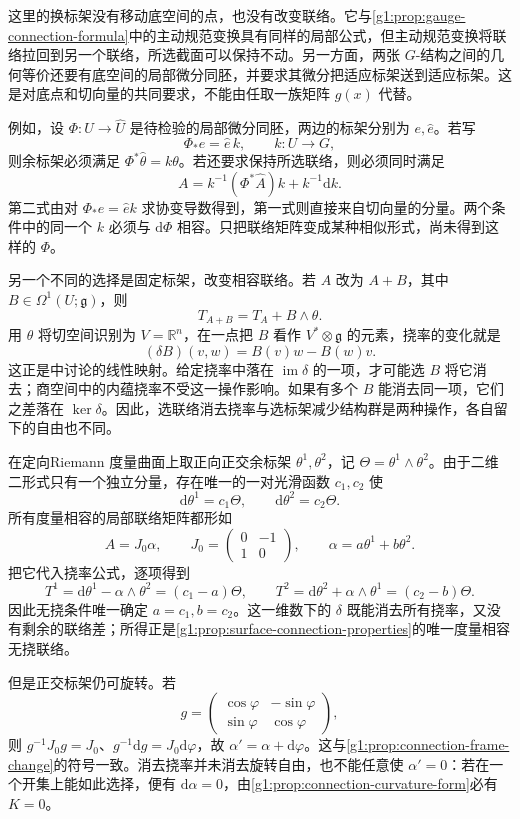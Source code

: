 这里的换标架没有移动底空间的点，也没有改变联络。它与\cref{g1:prop:gauge-connection-formula}中的主动规范变换具有同样的局部公式，但主动规范变换将联络拉回到另一个联络，所选截面可以保持不动。另一方面，两张 \(G\)-结构之间的几何等价还要有底空间的局部微分同胚，并要求其微分把适应标架送到适应标架。这是对底点和切向量的共同要求，不能由任取一族矩阵 \(g(x)\) 代替。

\ProseParagraphBreak

例如，设 \(\Phi:U\to\widehat U\) 是待检验的局部微分同胚，两边的标架分别为 \(e,\widehat e\)。若写
\[
	\Phi_*e=\widehat e\,k,\qquad k:U\to G,
\]
则余标架必须满足 \(\Phi^*\widehat\theta=k\theta\)。若还要求保持所选联络，则必须同时满足
\[
	A=k^{-1}(\Phi^*\widehat A)k+k^{-1}\mathrm{d}k.
\]
第二式由对 \(\Phi_*e=\widehat e k\) 求协变导数得到，第一式则直接来自切向量的分量。两个条件中的同一个 \(k\) 必须与 \(\mathrm{d}\Phi\) 相容。只把联络矩阵变成某种相似形式，尚未得到这样的 \(\Phi\)。

\ProseParagraphBreak

另一个不同的选择是固定标架，改变相容联络。若 \(A\) 改为 \(A+B\)，其中 \(B\in\Omega^1(U;\mathfrak g)\)，则
\[
	T_{A+B}=T_A+B\wedge\theta.
\]
用 \(\theta\) 将切空间识别为 \(V=\mathbb R^n\)，在一点把 \(B\) 看作 \(V^*\otimes\mathfrak g\) 的元素，挠率的变化就是
\[
	(\delta B)(v,w)=B(v)w-B(w)v.
\]
这正是中讨论的线性映射。给定挠率中落在 \(\operatorname{im}\delta\) 的一项，才可能选 \(B\) 将它消去；商空间中的内蕴挠率不受这一操作影响。如果有多个 \(B\) 能消去同一项，它们之差落在 \(\ker\delta\)。因此，选联络消去挠率与选标架减少结构群是两种操作，各自留下的自由也不同。

\begin{example}\label{g1:exm:surface-torsion-absorption}
	在定向Riemann 度量曲面上取正向正交余标架 \(\theta^1,\theta^2\)，记 \(\Theta=\theta^1\wedge\theta^2\)。由于二维二形式只有一个独立分量，存在唯一的一对光滑函数 \(c_1,c_2\) 使
	\[
		\mathrm{d}\theta^1=c_1\Theta,\qquad
		\mathrm{d}\theta^2=c_2\Theta.
	\]
	所有度量相容的局部联络矩阵都形如
	\[
		A=J_0\alpha,\qquad
		J_0=\begin{pmatrix}0&-1\\1&0\end{pmatrix},\qquad
		\alpha=a\theta^1+b\theta^2.
	\]
	把它代入挠率公式，逐项得到
	\[
		T^1=\mathrm{d}\theta^1-\alpha\wedge\theta^2=(c_1-a)\Theta,
		\qquad
		T^2=\mathrm{d}\theta^2+\alpha\wedge\theta^1=(c_2-b)\Theta.
	\]
	因此无挠条件唯一确定 \(a=c_1,b=c_2\)。这一维数下的 \(\delta\) 既能消去所有挠率，又没有剩余的联络差；所得正是\cref{g1:prop:surface-connection-properties}的唯一度量相容无挠联络。

	但是正交标架仍可旋转。若
	\[
		g=\begin{pmatrix}\cos\varphi&-\sin\varphi\\
		\sin\varphi&\cos\varphi\end{pmatrix},
	\]
	则 \(g^{-1}J_0g=J_0\)、\(g^{-1}\mathrm{d}g=J_0\mathrm{d}\varphi\)，故 \(\alpha'=\alpha+\mathrm{d}\varphi\)。这与\cref{g1:prop:connection-frame-change}的符号一致。消去挠率并未消去旋转自由，也不能任意使 \(\alpha'=0\)：若在一个开集上能如此选择，便有 \(\mathrm{d}\alpha=0\)，由\cref{g1:prop:connection-curvature-form}必有 \(K=0\)。
\end{example}

